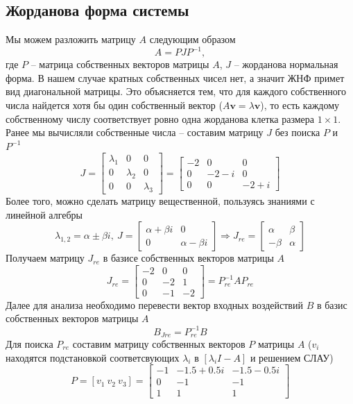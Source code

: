 \documentclass[a4paper, 12pt]{article}
\begin{document}
    \subsection{Жорданова форма системы}
    Мы можем разложить матрицу $A$ следующим образом
    $$A=PJP^{-1},$$ где $P$ -- матрица собственных векторов матрицы $A$, $J$ -- жорданова нормальная форма.
    В нашем случае кратных собственных чисел нет, а значит ЖНФ примет вид диагональной матрицы. Это объясняется тем,
    что для каждого собственного числа найдется хотя бы один собственный вектор ($A\textbf{v}=\lambda\textbf{v}$),
    то есть каждому собственному числу соответствует ровно одна жорданова клетка размера $1\times1$. Ранее мы
    вычисляли собственные числа -- составим матрицу $J$ без поиска $P$ и $P^{-1}$
    $$J=\begin{bmatrix}
        \lambda_1 &0 &0\\
        0 &\lambda_2 &0\\
        0 &0 &\lambda_3
    \end{bmatrix}=
    \begin{bmatrix}
        -2 &0 &0\\
        0 &-2-i &0\\
        0 &0 &-2+i
    \end{bmatrix}$$
    Более того, можно сделать матрицу вещественной, пользуясь знаниями с линейной алгебры
    $$
    \lambda_{1,2}=\alpha\pm\beta i,\ J=\begin{bmatrix}
        \alpha+\beta i &0\\
        0 &\alpha-\beta i
    \end{bmatrix}\Rightarrow J_{re}=\begin{bmatrix}
        \alpha &\beta\\
        -\beta &\alpha
    \end{bmatrix}
    $$
    Получаем матрицу $J_{re}$ в базисе собственных векторов матрицы $A$
    $$
    J_{re}=\begin{bmatrix}
        -2 &0 &0\\
        0 &-2 &1\\
        0 &-1 &-2
    \end{bmatrix}=P_{re}^{-1}AP_{re}
    $$
    Далее для анализа необходимо перевести вектор входных воздействий $B$ в базис собственных векторов матрицы $A$
    $$B_{Jre}=P_{re}^{-1}B$$
    Для поиска $P_{re}$ составим матрицу собственных векторов $P$ матрицы $A$
    ($v_i$ находятся подстановкой соответсвующих $\lambda_i$ в $\left[\lambda_i I-A\right]$ и решением СЛАУ)
    $$P=\left[v_1\ v_2\ v_3\right]=\begin{bmatrix}
        -1 &-1.5+0.5i &-1.5-0.5i\\
        0 &-1 &-1\\
        1 &1 &1
    \end{bmatrix}$$
\end{document}
